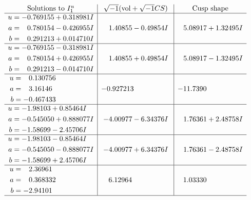 \documentclass[1p]{elsarticle_modified}
\theoremstyle{definition}
\newcommand{\I}{\sqrt{-1}}
\begin{document}
$$\begin{array}{c|c|c}  
\text{Solutions to }I^u_{1}& \I (\text{vol} + \sqrt{-1}CS) & \text{Cusp shape}\\
 \hline 
\begin{aligned}
u &= -0.769155 + 0.318981 I \\
a &= \phantom{-}0.780154 - 0.426955 I \\
b &= \phantom{-}0.291213 + 0.014710 I\end{aligned}
 & \phantom{-}1.40855 - 0.49854 I & \phantom{-}5.08917 + 1.32495 I \\ \hline\begin{aligned}
u &= -0.769155 - 0.318981 I \\
a &= \phantom{-}0.780154 + 0.426955 I \\
b &= \phantom{-}0.291213 - 0.014710 I\end{aligned}
 & \phantom{-}1.40855 + 0.49854 I & \phantom{-}5.08917 - 1.32495 I \\ \hline\begin{aligned}
u &= \phantom{-}0.130756\phantom{ +0.000000I} \\
a &= \phantom{-}3.16146\phantom{ +0.000000I} \\
b &= -0.467433\phantom{ +0.000000I}\end{aligned}
 & -0.927213\phantom{ +0.000000I} & -11.7390\phantom{ +0.000000I} \\ \hline\begin{aligned}
u &= -1.98103 + 0.85464 I \\
a &= -0.545050 + 0.888077 I \\
b &= -1.58699 - 2.45706 I\end{aligned}
 & -4.00977 - 6.34376 I & \phantom{-}1.76361 + 2.48758 I \\ \hline\begin{aligned}
u &= -1.98103 - 0.85464 I \\
a &= -0.545050 - 0.888077 I \\
b &= -1.58699 + 2.45706 I\end{aligned}
 & -4.00977 + 6.34376 I & \phantom{-}1.76361 - 2.48758 I \\ \hline\begin{aligned}
u &= \phantom{-}2.36961\phantom{ +0.000000I} \\
a &= \phantom{-}0.368332\phantom{ +0.000000I} \\
b &= -2.94101\phantom{ +0.000000I}\end{aligned}
 & \phantom{-}6.12964\phantom{ +0.000000I} & \phantom{-}1.03330\phantom{ +0.000000I}\\
 \hline 
 \end{array}$$\newpage\newpage\renewcommand{\arraystretch}{1}
\end{document}
